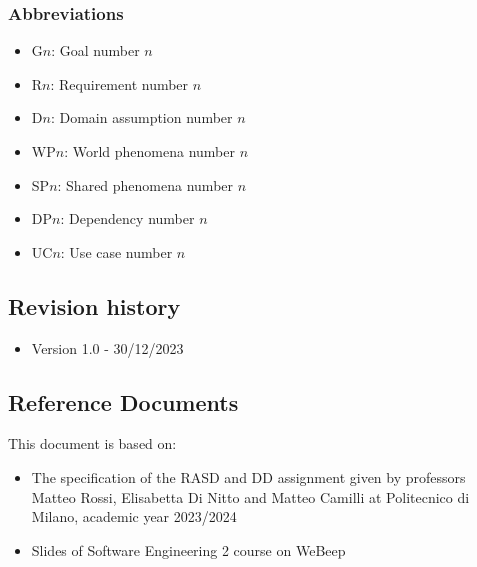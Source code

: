\subsubsection{Abbreviations}
\begin{itemize}
    \item G$n$: Goal number $n$
    \item R$n$: Requirement number $n$
    \item D$n$: Domain assumption number $n$
    \item WP$n$: World phenomena number $n$
    \item SP$n$: Shared phenomena number $n$
    \item DP$n$: Dependency number $n$
    \item UC$n$: Use case number $n$
\end{itemize}

\subsection{Revision history}
\begin{itemize}
    \item Version 1.0 - 30/12/2023
\end{itemize}


\subsection{Reference Documents}
This document is based on:
\begin{itemize}
    \item The specification of the RASD and DD assignment given by professors Matteo Rossi, Elisabetta Di Nitto and Matteo Camilli at Politecnico di Milano, academic year 2023/2024
    \item Slides of Software Engineering 2 course on WeBeep
\end{itemize}

